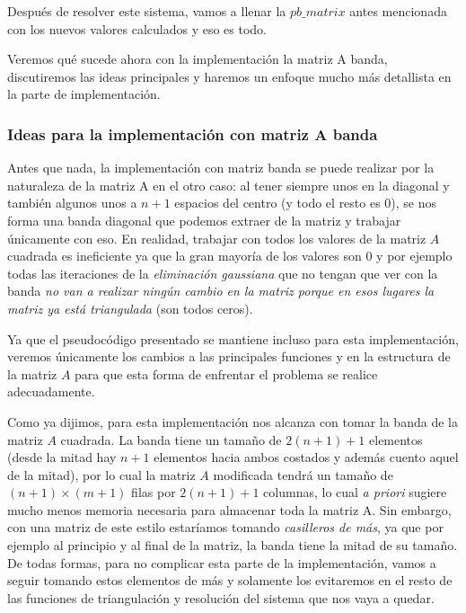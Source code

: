 \vspace{\baselineskip}

Después de resolver este sistema, vamos a llenar la $pb\_matrix$ antes mencionada con los nuevos valores calculados y eso es todo.

\vspace{\baselineskip}

\vspace{\baselineskip}
\par
Veremos qué sucede ahora con la implementación la matriz A banda, discutiremos las ideas principales y haremos un enfoque mucho más detallista en la parte de implementación.

\subsubsection{Ideas para la implementación con matriz A banda}

Antes que nada, la implementación con matriz banda se puede realizar por la naturaleza de la matriz A en el otro caso: al tener siempre unos en la diagonal y también algunos unos a $n+1$ espacios del centro (y todo el resto es 0), se nos forma una banda diagonal que podemos extraer de la matriz y trabajar únicamente con eso. En realidad, trabajar con todos los valores de la matriz $A$ cuadrada es ineficiente ya que la gran mayoría de los valores son 0 y por ejemplo todas las iteraciones de la \textit{eliminación gaussiana} que no tengan que ver con la banda \textit{no van a realizar ningún cambio en la matriz porque en esos lugares la matriz ya está triangulada} (son todos ceros).

Ya que el pseudocódigo presentado se mantiene incluso para esta implementación, veremos únicamente los cambios a las principales funciones y en la estructura de la matriz $A$ para que esta forma de enfrentar el problema se realice adecuadamente.

\vspace{\baselineskip}

Como ya dijimos, para esta implementación nos alcanza con tomar la banda de la matriz $A$ cuadrada. La banda tiene un tamaño de $2(n+1)+1$ elementos (desde la mitad hay $n+1$ elementos hacia ambos costados y además cuento aquel de la mitad), por lo cual la matriz $A$ modificada tendrá un tamaño de $(n+1) \times (m+1)$ filas por $2(n+1)+1$ columnas, lo cual \textit{a priori} sugiere mucho menos memoria necesaria para almacenar toda la matriz A. Sin embargo, con una matriz de este estilo estaríamos tomando \textit{casilleros de más}, ya que por ejemplo al principio y al final de la matriz, la banda tiene la mitad de su tamaño. De todas formas, para no complicar esta parte de la implementación, vamos a seguir tomando estos elementos de más y solamente los evitaremos en el resto de las funciones de triangulación y resolución del sistema que nos vaya a quedar.

